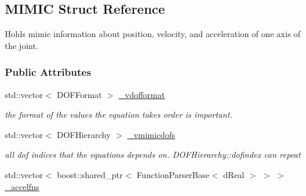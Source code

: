 \hypertarget{structOpenRAVE_1_1KinBody_1_1Joint_1_1MIMIC}{
\subsection{MIMIC Struct Reference}
\label{structOpenRAVE_1_1KinBody_1_1Joint_1_1MIMIC}
}


Holds mimic information about position, velocity, and acceleration of one axis of the joint.  


\subsubsection*{Public Attributes}
\begin{DoxyCompactItemize}
\item 
\hypertarget{structOpenRAVE_1_1KinBody_1_1Joint_1_1MIMIC_a8200045292ac48810750b8fe7ff145fb}{
std::vector$<$ DOFFormat $>$ \hyperlink{structOpenRAVE_1_1KinBody_1_1Joint_1_1MIMIC_a8200045292ac48810750b8fe7ff145fb}{\_\-vdofformat}}
\label{structOpenRAVE_1_1KinBody_1_1Joint_1_1MIMIC_a8200045292ac48810750b8fe7ff145fb}

\begin{DoxyCompactList}\small\item\em the format of the values the equation takes order is important. \item\end{DoxyCompactList}\item 
\hypertarget{structOpenRAVE_1_1KinBody_1_1Joint_1_1MIMIC_a88385fe7c2cecd8d6e625252f60a8f1f}{
std::vector$<$ DOFHierarchy $>$ \hyperlink{structOpenRAVE_1_1KinBody_1_1Joint_1_1MIMIC_a88385fe7c2cecd8d6e625252f60a8f1f}{\_\-vmimicdofs}}
\label{structOpenRAVE_1_1KinBody_1_1Joint_1_1MIMIC_a88385fe7c2cecd8d6e625252f60a8f1f}

\begin{DoxyCompactList}\small\item\em all dof indices that the equations depends on. DOFHierarchy::dofindex can repeat \item\end{DoxyCompactList}\item 
\hypertarget{structOpenRAVE_1_1KinBody_1_1Joint_1_1MIMIC_afa8152d59e3406ade563decf34300195}{
std::vector$<$ boost::shared\_\-ptr$<$ FunctionParserBase$<$ dReal $>$ $>$ $>$ \hyperlink{structOpenRAVE_1_1KinBody_1_1Joint_1_1MIMIC_afa8152d59e3406ade563decf34300195}{\_\-accelfns}}
\label{structOpenRAVE_1_1KinBody_1_1Joint_1_1MIMIC_afa8152d59e3406ade563decf34300195}


\end{DoxyCompactItemize}
